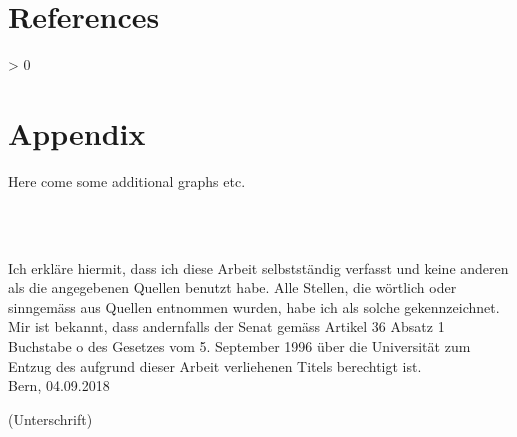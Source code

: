 \documentclass[
]{article}
\newlength{\cslhangindent}
\newenvironment{CSLReferences}[2] %
 {%
  \setlength{\parindent}{0pt}
  \ifodd #1 \everypar{\setlength{\hangindent}{\cslhangindent}}\ignorespaces\fi
  \ifnum #2 > 0
  \setlength{\parskip}{#2\baselineskip}
  \fi
 }%
 {}
\begin{document}
\newpage

\hypertarget{references}{%
\section*{References}\label{references}}

\hypertarget{refs}{}
\begin{CSLReferences}{0}{0}
\end{CSLReferences}

\hypertarget{appendix}{%
\section{Appendix}\label{appendix}}

Here come some additional graphs etc.


\FloatBarrier
\newpage


\thispagestyle{empty}

\ \vspace{1cm}

 \\[0.4cm]

\noindent Ich erkl\"are hiermit, dass ich diese Arbeit selbstst\"andig verfasst und keine
anderen als die angegebenen Quellen benutzt habe. Alle Stellen, die w\"ortlich oder sinngem\"ass aus Quellen entnommen wurden, habe ich als solche gekennzeichnet. Mir ist bekannt, dass andernfalls der Senat gem\"ass Artikel 36 Absatz 1 Buchstabe o des Gesetzes vom 5. September 1996 \"uber die Universit\"at zum Entzug des aufgrund dieser Arbeit verliehenen Titels
berechtigt ist.\\[0.5cm]

\noindent Bern, 04.09.2018 \hspace{5cm} \hrulefill \hspace{1cm} \\[0cm]
\noindent \begin{minipage}[h]{15cm} \hspace{10cm}  {\small (Unterschrift)}
\end{minipage}
\end{document}
